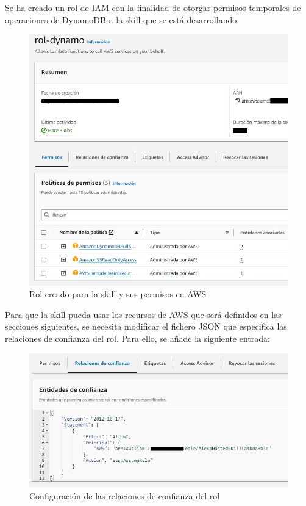 Se ha creado un rol de IAM con la finalidad de otorgar permisos temporales de operaciones de DynamoDB a la skill que se está desarrollando.

\begin{figure}[H]
	\centering
	\includegraphics[width=1\textwidth]{imgs/aws-iam-1.png}
	\caption{Rol creado para la skill y sus permisos en AWS}
	\label{fig:aws-iam-1}
\end{figure}

Para que la skill pueda usar los recursos de AWS que será definidos en las secciones siguientes, se necesita modificar el fichero JSON que especifica las relaciones de confianza del rol. Para ello, se añade la siguiente entrada:

\begin{figure}[H]
	\centering
	\includegraphics[width=1\textwidth]{imgs/aws-iam-3.png}
	\caption{Configuración de las relaciones de confianza del rol}
	\label{fig:aws-iam-3}
\end{figure}


